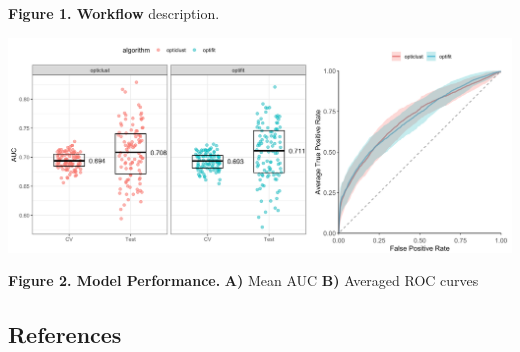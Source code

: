\documentclass[
  11pt,
]{article}
\begin{document}
\textbf{Figure 1. Workflow} description.

\includegraphics{../exploratory/figures/Figure2.png}

\textbf{Figure 2. Model Performance.} \textbf{A)} Mean AUC \textbf{B)}
Averaged ROC curves

\newpage

\hypertarget{references}{%
\subsection{References}\label{references}}
\end{document}
